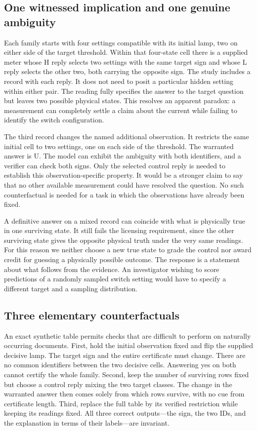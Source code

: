 \documentclass[12pt,letterpaper]{article}
\begin{document}
\subsection{One witnessed implication and one genuine ambiguity}

Each family starts with four settings compatible with its initial lamp, two on either side of the target threshold. Within that four-state cell there is a supplied meter whose H reply selects two settings with the same target sign and whose L reply selects the other two, both carrying the opposite sign. The study includes a record with each reply. It does not need to posit a particular hidden setting within either pair. The reading fully specifies the answer to the target question but leaves two possible physical states. This resolves an apparent paradox: a measurement can completely settle a claim about the current while failing to identify the switch configuration.

The third record changes the named additional observation. It restricts the same initial cell to two settings, one on each side of the threshold. The warranted answer is U. The model can exhibit the ambiguity with both identifiers, and a verifier can check both signs. Only the selected control reply is needed to establish this observation-specific property. It would be a stronger claim to say that no other available measurement could have resolved the question. No such counterfactual is needed for a task in which the observations have already been fixed.

A definitive answer on a mixed record can coincide with what is physically true in one surviving state. It still fails the licensing requirement, since the other surviving state gives the opposite physical truth under the very same readings. For this reason we neither choose a new true state to grade the control nor award credit for guessing a physically possible outcome. The response is a statement about what follows from the evidence. An investigator wishing to score predictions of a randomly sampled switch setting would have to specify a different target and a sampling distribution.

\subsection{Three elementary counterfactuals}

An exact synthetic table permits checks that are difficult to perform on naturally occurring documents. First, hold the initial observation fixed and flip the supplied decisive lamp. The target sign and the entire certificate must change. There are no common identifiers between the two decisive cells. Answering yes on both cannot certify the whole family. Second, keep the number of surviving rows fixed but choose a control reply mixing the two target classes. The change in the warranted answer then comes solely from which rows survive, with no cue from certificate length. Third, replace the full table by its verified restriction while keeping its readings fixed. All three correct outputs---the sign, the two IDs, and the explanation in terms of their labels---are invariant.
\end{document}

